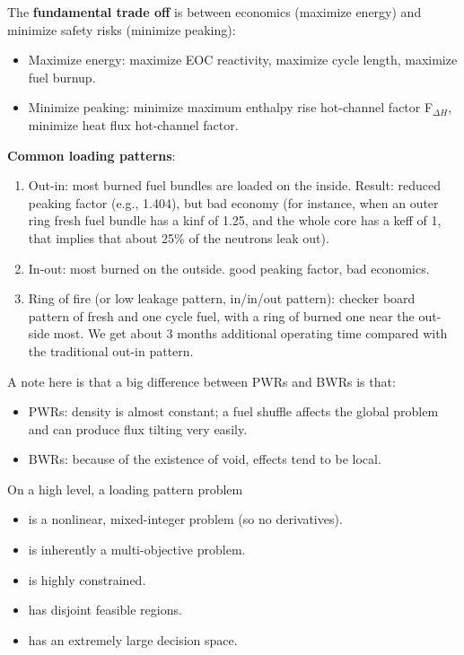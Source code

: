 \documentclass{school-22.211-notes}
\begin{document}

The \textbf{fundamental trade off} is between economics (maximize energy) and
minimize safety risks (minimize peaking):

\begin{itemize}
\item Maximize energy: maximize EOC reactivity, maximize cycle length,
  maximize fuel burnup.
\item Minimize peaking: minimize maximum enthalpy rise hot-channel
  factor F$_{\Delta H}$, minimize heat flux hot-channel factor.
\end{itemize}

\textbf{Common loading patterns}: 

\begin{enumerate}
\item Out-in: most burned fuel bundles are loaded on the
  inside. Result: reduced peaking factor (e.g., 1.404), but bad
  economy (for instance, when an outer ring fresh fuel bundle has a
  kinf of 1.25, and the whole core has a keff of 1, that implies that
  about 25\% of the neutrons leak out).

\item In-out: most burned on the outside. good peaking factor, bad economics.

\item Ring of fire (or low leakage pattern, in/in/out pattern):
  checker board pattern of fresh and one cycle fuel, with a ring of
  burned one near the out-side most. We get about 3 months additional
  operating time compared with the traditional out-in pattern.
\end{enumerate}

A note here is that a big difference between PWRs and BWRs is that: 

\begin{itemize}

\item PWRs: density is almost constant; a fuel shuffle affects the
  global problem and can produce flux tilting very easily.

\item BWRs: because of the existence of void, effects tend to be local. 

\end{itemize}


On a high level, a loading pattern problem

\begin{itemize}
\item is a nonlinear, mixed-integer problem (so no derivatives).
\item is inherently a multi-objective problem. 
\item is highly constrained. 
\item has disjoint feasible regions.
\item has an extremely large decision space. 
\end{itemize}
\end{document}
